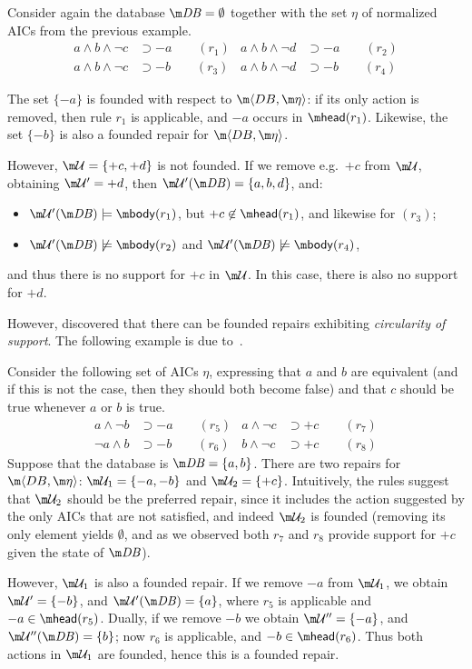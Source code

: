 \begin{example}
  Consider again the database $\db=\emptyset$ together with the set $\eta$ of normalized AICs from the previous example.
  \begin{align*}
    a\land b\land\neg c &\supset{-a} \qquad(r_1) &
    a\land b\land\neg d &\supset{-a} \qquad(r_2) \\
    a\land b\land\neg c &\supset{-b} \qquad(r_3) &
    a\land b\land\neg d &\supset{-b} \qquad(r_4)
  \end{align*}

  The set $\{{-a}\}$ is founded with respect to $\fulldb$: if its only action is removed, then rule $r_1$ is applicable, and ${-a}$ occurs in $\head(r_1)$.
  Likewise, the set $\{{-b}\}$ is also a founded repair for $\fulldb$.

  However, $\UU=\{{+c},{+d}\}$ is not founded.
  If we remove e.g.~${+c}$ from $\UU$, obtaining $\UU'={+d}$, then $\UU'(\db)=\{a,b,d\}$, and:
  \begin{itemize}
  \item $\UU'(\db)\models\body(r_1)$, but ${+c}\not\in\head(r_1)$, and likewise for $(r_3)$;
  \item $\UU'(\db)\not\models\body(r_2)$ and $\UU'(\db)\not\models\body(r_4)$,
  \end{itemize}
  and thus there is no support for ${+c}$ in $\UU$.
  In this case, there is also no support for ${+d}$.
\end{example}

However, \citet{tplp/CaropreseT11} discovered that there can be founded repairs exhibiting \emph{circularity of support}.
The following example is due to~\cite{tase/Cruz-FilipeEGN13}.

\begin{example}
  \label{ex:founded}
  Consider the following set of AICs $\eta$, expressing that $a$ and $b$ are equivalent (and if this is not the case, then they should both become false) and that $c$ should be true whenever $a$ or $b$ is true.
  \begin{align*}
    a\land\neg b &\supset{-a} \qquad(r_5)&
    a\land\neg c &\supset{+c} \qquad(r_7)\\
    \neg a\land b &\supset{-b} \qquad(r_6)&
    b\land\neg c &\supset{+c} \qquad(r_8)
  \end{align*}
  Suppose that the database is $\db=\{a,b\}$.
  There are two repairs for $\fulldb$: $\UU_1=\{{-a},{-b}\}$ and $\UU_2=\{{+c}\}$.
  Intuitively, the rules suggest that $\UU_2$ should be the preferred repair, since it includes the action suggested by the only AICs that are not satisfied, and indeed $\UU_2$ is founded (removing its only element yields $\emptyset$, and as we observed both $r_7$ and $r_8$ provide support for ${+c}$ given the state of $\db$).

  However, $\UU_1$ is also a founded repair.
  If we remove ${-a}$ from $\UU_1$, we obtain $\UU'=\{{-b}\}$, and $\UU'(\db)=\{a\}$, where $r_5$ is applicable and ${-a}\in\head(r_5)$.
  Dually, if we remove ${-b}$ we obtain $\UU''=\{{-a}\}$, and $\UU''(\db)=\{b\}$; now $r_6$ is applicable, and ${-b}\in\head(r_6)$.
  Thus both actions in $\UU_1$ are founded, hence this is a founded repair.
\end{example}

